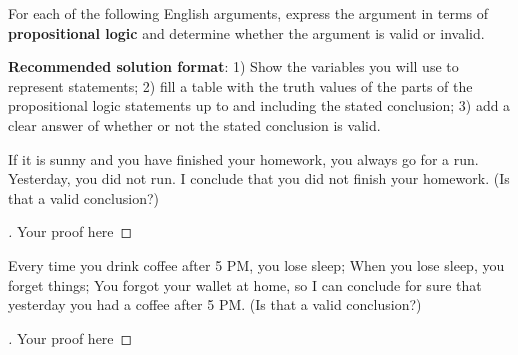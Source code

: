 \documentclass[12pt]{article}
\newenvironment{exercise}[2][Exercise]{\begin{trivlist}
\item[\hskip \labelsep {\bfseries #1}\hskip \labelsep {\bfseries #2.}]}{\end{trivlist}}
\newenvironment{solution}[1][{\color{red} Solution:}]{\begin{trivlist}
\item[\hskip \labelsep {\bfseries #1}\hskip \labelsep {\bfseries}]}{\end{trivlist}}
\begin{document}
 

\newcommand{\mainName}{Your Name Here} %

\newcommand{\collaborators}{
    Team: \textit{(Collaborator names here)}
}


\begin{exercise}{1}
For each of the following English arguments, express the argument in terms of \textbf{propositional logic} and determine whether the argument is valid or invalid.

\textbf{Recommended solution format}: 1) Show the variables you will use to represent statements; 2) fill a table with the truth values of the parts of the propositional logic statements up to and including the stated conclusion; 3) add a clear answer of whether or not the stated conclusion is valid.

\begin{enumerate}[(a)]


\item If it is sunny and you have finished your homework, you always go for a run. Yesterday, you did not run. I conclude that you did not finish your homework. (Is that a valid conclusion?)
    \begin{solution} 
        \begin{proof}[\unskip\nopunct]
            Your proof here
        \end{proof}

    
    \end{solution}


    \item Every time you drink coffee after 5 PM, you lose sleep; When you lose sleep, you forget things; You forgot your wallet at home, so I can conclude for sure that yesterday you had a coffee after 5 PM. (Is that a valid conclusion?)
    
    \begin{solution} 
        \begin{proof}[\unskip\nopunct]
            Your proof here
        \end{proof}
    \end{solution}
    
\end{enumerate}
\end{exercise}
\end{document}
